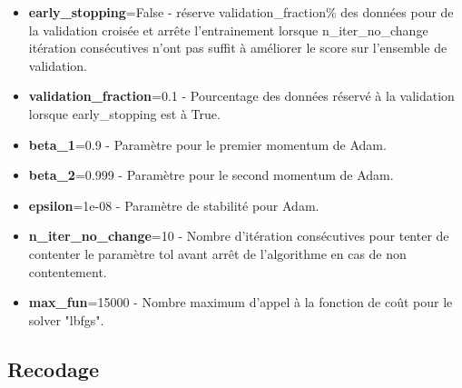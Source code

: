 \documentclass{ceri/sty/rapport}
\begin{document}
\begin{itemize}
    \item \textbf{early\_stopping}=False - réserve validation\_fraction\% des données pour de la validation croisée et arrête l'entrainement lorsque n\_iter\_no\_change itération consécutives n'ont pas suffit à améliorer le score sur l'ensemble de validation.\\
    
    \item \textbf{validation\_fraction}=0.1 - Pourcentage des données réservé à la validation lorsque early\_stopping est à True.\\
    
    \item \textbf{beta\_1}=0.9 - Paramètre pour le premier momentum de Adam.\\
    
    \item \textbf{beta\_2}=0.999 - Paramètre pour le second momentum de Adam.\\
    
    \item \textbf{epsilon}=1e-08 - Paramètre de stabilité pour Adam.
    
    \item \textbf{n\_iter\_no\_change}=10 - Nombre d'itération consécutives pour tenter de contenter le paramètre tol avant arrêt de l'algorithme en cas de non contentement.\\
    
    \item \textbf{max\_fun}=15000 - Nombre maximum d'appel à la fonction de coût pour le solver "lbfgs".\\
\end{itemize}

\subsection{Recodage}
\end{document}
